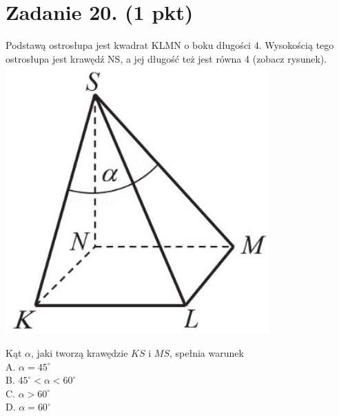 \documentclass[10pt]{article}
\begin{document}
\section*{Zadanie 20. (1 pkt)}
Podstawą ostrosłupa jest kwadrat KLMN o boku długości 4. Wysokością tego ostrosłupa jest krawędź NS, a jej długość też jest równa 4 (zobacz rysunek).\\
\includegraphics[max width=\textwidth, center]{2024_11_21_9383c97fb44abf35abe9g-10(1)}

Kąt \(\alpha\), jaki tworzą krawędzie \(K S\) i \(M S\), spełnia warunek\\
A. \(\alpha=45^{\circ}\)\\
B. \(45^{\circ}<\alpha<60^{\circ}\)\\
C. \(\alpha>60^{\circ}\)\\
D. \(\alpha=60^{\circ}\)
\end{document}
